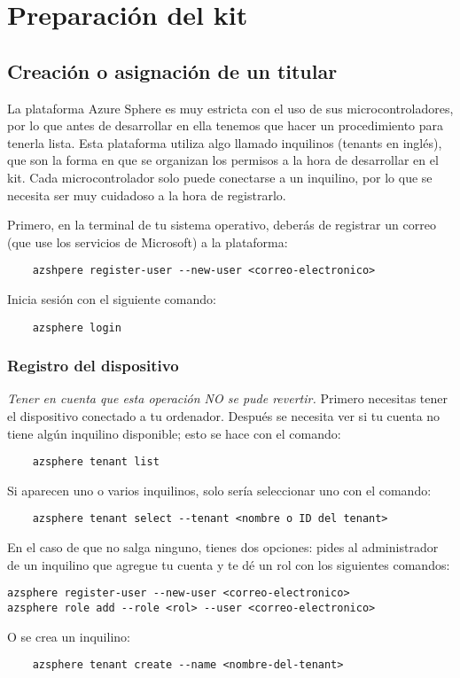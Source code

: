 \section{Preparación del kit}
\subsection{Creación o asignación de un titular}
La plataforma Azure Sphere es muy estricta con el uso de sus microcontroladores, por lo que antes de desarrollar en ella tenemos que hacer un procedimiento para tenerla lista. Esta plataforma utiliza algo llamado inquilinos (tenants en inglés), que son la forma en que se organizan los permisos a la hora de desarrollar en el kit. Cada microcontrolador solo puede conectarse a un inquilino, por lo que se necesita ser muy cuidadoso a la hora de registrarlo.

Primero, en la terminal de tu sistema operativo, deberás de registrar un correo (que use los servicios de Microsoft) a la plataforma: 
\begin{verbatim}
	azshpere register-user --new-user <correo-electronico>
\end{verbatim}

Inicia sesión con el siguiente comando:
\begin{verbatim}
	azsphere login
\end{verbatim}

\subsubsection{Registro del dispositivo}
\textit{Tener en cuenta que esta operación NO se pude revertir.}
\linebreak
\linebreak
Primero necesitas tener el dispositivo conectado a tu ordenador. Después se necesita ver si tu cuenta no tiene algún inquilino disponible; esto se hace con el comando:
\begin{verbatim}
	azsphere tenant list
\end{verbatim}
Si aparecen uno o varios inquilinos, solo sería seleccionar uno con el comando:
\begin{verbatim}
	azsphere tenant select --tenant <nombre o ID del tenant>
\end{verbatim}

En el caso de que no salga ninguno, tienes dos opciones: pides al administrador de un inquilino que agregue tu cuenta y te dé un rol con los siguientes comandos:
\begin{verbatim}
azsphere register-user --new-user <correo-electronico>
azsphere role add --role <rol> --user <correo-electronico>
\end{verbatim}
O se crea un inquilino:
\begin{verbatim}
	azsphere tenant create --name <nombre-del-tenant>
\end{verbatim}


